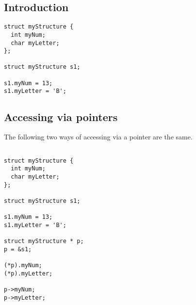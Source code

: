 
\subsection{Introduction}

\begin{verbatim}
struct myStructure {
  int myNum;
  char myLetter;
};

struct myStructure s1;

s1.myNum = 13;
s1.myLetter = 'B';

\end{verbatim}

\subsection{Accessing via pointers}

The following two ways of accessing via a pointer are the same.
\begin{verbatim}

struct myStructure {
  int myNum;
  char myLetter;
};

struct myStructure s1;

s1.myNum = 13;
s1.myLetter = 'B';

struct myStructure * p;
p = &s1;

(*p).myNum;
(*p).myLetter;

p->myNum;
p->myLetter;
\end{verbatim}

